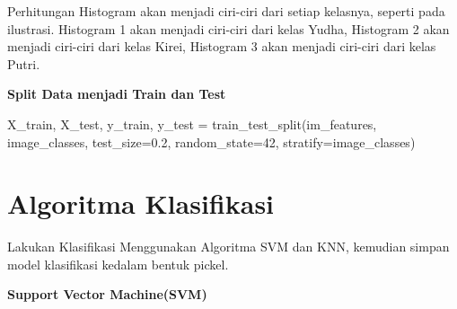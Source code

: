 \documentclass[
  letterpaper,
  DIV=11,
  numbers=noendperiod]{scrreprt}
\newenvironment{Shaded}{\begin{snugshade}}{\end{snugshade}}
\newcommand{\DecValTok}[1]{\textcolor[rgb]{0.68,0.00,0.00}{#1}}
\newcommand{\FloatTok}[1]{\textcolor[rgb]{0.68,0.00,0.00}{#1}}
\newcommand{\NormalTok}[1]{\textcolor[rgb]{0.00,0.23,0.31}{#1}}
\newcommand{\OperatorTok}[1]{\textcolor[rgb]{0.37,0.37,0.37}{#1}}
\begin{document}
\begin{tcolorbox}[enhanced jigsaw, opacityback=0, colbacktitle=quarto-callout-tip-color!10!white, breakable, titlerule=0mm, left=2mm, toptitle=1mm, rightrule=.15mm, leftrule=.75mm, colback=white, opacitybacktitle=0.6, arc=.35mm, toprule=.15mm, coltitle=black, colframe=quarto-callout-tip-color-frame, bottomtitle=1mm, title=\textcolor{quarto-callout-tip-color}{\faLightbulb}\hspace{0.5em}{Tip}, bottomrule=.15mm]

Perhitungan Histogram akan menjadi ciri-ciri dari setiap kelasnya,
seperti pada ilustrasi. Histogram 1 akan menjadi ciri-ciri dari kelas
Yudha, Histogram 2 akan menjadi ciri-ciri dari kelas Kirei, Histogram 3
akan menjadi ciri-ciri dari kelas Putri.

\end{tcolorbox}

\textbf{Split Data menjadi Train dan Test}

\begin{Shaded}
\begin{Highlighting}[]
\NormalTok{X\_train, X\_test, y\_train, y\_test }\OperatorTok{=}\NormalTok{ train\_test\_split(im\_features, image\_classes, test\_size}\OperatorTok{=}\FloatTok{0.2}\NormalTok{, random\_state}\OperatorTok{=}\DecValTok{42}\NormalTok{, stratify}\OperatorTok{=}\NormalTok{image\_classes)}
\end{Highlighting}
\end{Shaded}

\hypertarget{algoritma-klasifikasi}{%
\section*{Algoritma Klasifikasi}\label{algoritma-klasifikasi}}


Lakukan Klasifikasi Menggunakan Algoritma SVM dan KNN, kemudian simpan
model klasifikasi kedalam bentuk pickel.

\textbf{Support Vector Machine(SVM)}
\end{document}
